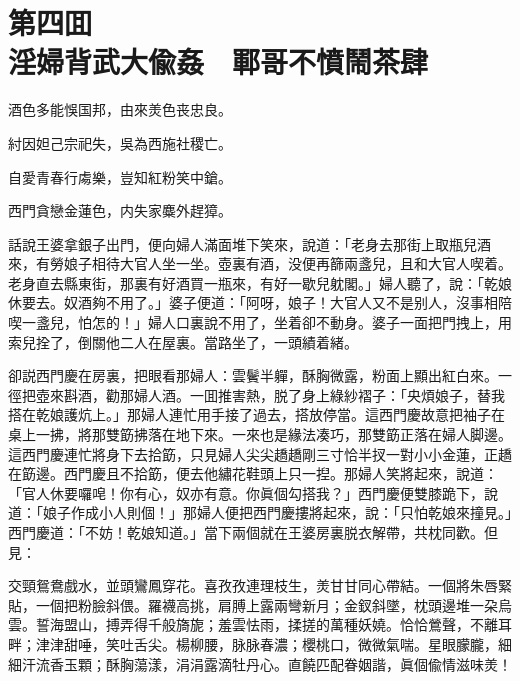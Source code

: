 
\chapter*{第四囬　\\淫婦背武大偸姦　鄆哥不憤鬧茶肆}


\begin{myquote}
酒色多能悞国邦，由來羙色丧忠良。

紂因妲己宗祀失，吳為西施社稷亡。

自愛青春行䖏樂，豈知紅粉笑中鎗。

西門貪戀金蓮色，内失家麋外趕獐。
\end{myquote}

話說王婆拿銀子出門，便向婦人滿面堆下笑來，說道：「老身去那街上取瓶兒酒來，有勞娘子相待大官人坐一坐。壺裏有酒，没便再篩兩盞兒，且和大官人喫着。老身直去縣東街，那裏有好酒買一瓶來，有好一歇兒躭閣。」婦人聽了，說：「乾娘休要去。奴酒夠不用了。」婆子便道：「阿呀，娘子！大官人又不是别人，沒事相陪喫一盞兒，怕怎的！」婦人口裏說不用了，坐着卻不動身。婆子一面把門拽上，用索兒拴了，倒關他二人在屋裏。當路坐了，一頭績着緒。

卻説西門慶在房裏，把眼看那婦人：雲鬢半軃，酥胸微露，粉面上顯出紅白來。一徑把壺來斟酒，勸那婦人酒。一囬推害熱，脱了身上綠紗褶子：「央煩娘子，替我搭在乾娘護炕上。」那婦人連忙用手接了過去，搭放停當。這西門慶故意把袖子在桌上一拂，將那雙筯拂落在地下來。一來也是緣法凑巧，那雙筯正落在婦人脚邊。這西門慶連忙將身下去拾筯，只見婦人尖尖趫趫剛三寸恰半扠一對小小金蓮，正趫在筯邊。西門慶且不拾筯，便去他繡花鞋頭上只一揑。那婦人笑將起來，說道：「官人休要囉唣！你有心，奴亦有意。你眞個勾搭我？」西門慶便雙膝跪下，說道：「娘子作成小人則個！」那婦人便把西門慶摟將起來，說：「只怕乾娘來撞見。」西門慶道：「不妨！乾娘知道。」當下兩個就在王婆房裏脱衣解帶，共枕同歡。但見：

\begin{myquote}
交頸鴛鴦戲水，並頭鸞鳳穿花。喜孜孜連理枝生，羙甘甘同心帶結。一個將朱唇緊貼，一個把粉臉斜偎。羅襪高挑，肩膊上露兩彎新月；金釵斜墜，枕頭邊堆一朶烏雲。誓海盟山，搏弄得千般旖旎；羞雲怯雨，揉搓的萬種妖嬈。恰恰鶯聲，不離耳畔；津津甜唾，笑吐舌尖。楊柳腰，脉脉春濃；櫻桃口，微微氣喘。星眼朦朧，細細汗流香玉顆；酥胸蕩漾，涓涓露滴牡丹心。直饒匹配眷姻諧，眞個偸情滋味羙！
\end{myquote}

